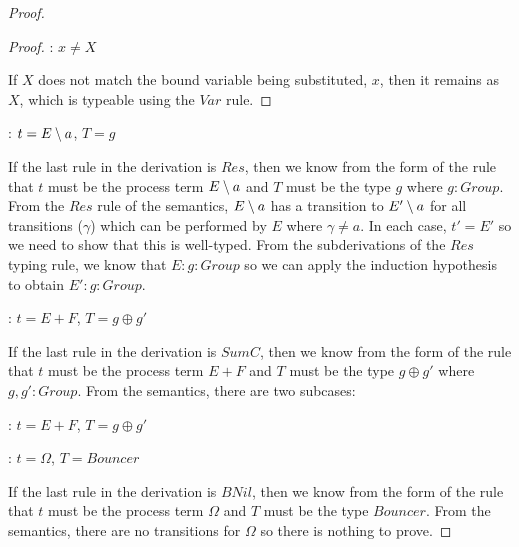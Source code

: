 \begin{proof}
\begin{proof}
: $x \ne X$

\noindent If $X$ does not match the bound variable being substituted, $x$, then it
remains as $X$, which is typeable using the $Var$ rule.

\end{proof}

: $t = E \setminus {a}$, $T = g$

\noindent If the last rule in the derivation is $Res$, then we know
from the form of the rule that $t$ must be the process term $E
\setminus {a}$ and $T$ must be the type $g$ where $g : Group$.  From the
$Res$ rule of the semantics, $E \setminus {a}$ has a transition to $E'
\setminus {a}$ for all transitions ($\gamma$) which can be performed by $E$
where $\gamma \ne a$.  In each case, $t' = E'$ so we need
to show that this is well-typed.  From the subderivations of the $Res$
typing rule, we know that $E : g : Group$ so we can apply the
induction hypothesis to obtain $E' : g : Group$.

: $t = E + F$, $T = g \oplus g'$

\noindent If the last rule in the derivation is $SumC$, then we know
from the form of the rule that $t$ must be the process term $E + F$
and $T$ must be the type $g \oplus g'$ where $g, g' : Group$.  From
the semantics, there are two subcases:

: $t = E + F$, $T = g \oplus g'$


\noindent 
{}: $t = \Omega$, $T = Bouncer$

\noindent If the last rule in the derivation is $BNil$, then we know
from the form of the rule that $t$ must be the process term $\Omega$
and $T$ must be the type $Bouncer$.  From the semantics, there are no
transitions for $\Omega$ so there is nothing to prove.

\end{proof}

